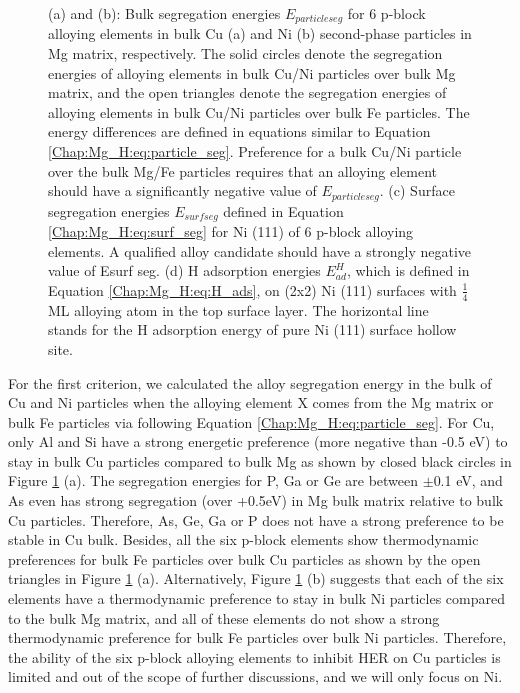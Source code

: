 \begin{figure}[!ht]
\caption[Effects of 6 p-block elements on other precipitates(Cu and Ni)]{(a) and (b): Bulk segregation energies $E_{particle seg}$ for 6 p-block alloying elements in bulk Cu (a) and Ni (b) second-phase particles in Mg matrix, respectively. The solid circles denote the segregation energies of alloying elements in bulk Cu/Ni particles over bulk Mg matrix, and the open triangles denote the segregation energies of alloying elements in bulk Cu/Ni particles over bulk Fe particles. The energy differences are defined in equations similar to Equation \ref{Chap:Mg_H:eq:particle_seg}. Preference for a bulk Cu/Ni particle over the bulk Mg/Fe particles requires that an alloying element should have a significantly negative value of $E_{particle seg}$. (c) Surface segregation energies $E_{surf seg}$ defined in Equation \ref{Chap:Mg_H:eq:surf_seg} for Ni (111) of 6 p-block alloying elements. A qualified alloy candidate should have a strongly negative value of Esurf seg. (d) H adsorption energies $E_{ad}^H$, which is defined in Equation \ref{Chap:Mg_H:eq:H_ads}, on (2x2) Ni (111) surfaces with $\frac{1}{4}$ \ac{ML} alloying atom in the top surface layer. The horizontal line stands for the H adsorption energy of pure Ni (111) surface hollow site.}
  \label{Chap:Mg_H:fig12}
\end{figure}
\endgroup

For the first criterion, we calculated the alloy segregation energy in the bulk of Cu and Ni particles when the alloying element X comes from the Mg matrix or bulk Fe particles via following Equation \ref{Chap:Mg_H:eq:particle_seg}. For Cu, only Al and Si have a strong energetic preference (more negative than -0.5 eV) to stay in bulk Cu particles compared to bulk Mg as shown by closed black circles in Figure \ref{Chap:Mg_H:fig12} (a). The segregation energies for P, Ga or Ge are between $\pm$0.1 eV, and As even has strong segregation (over +0.5eV) in Mg bulk matrix relative to bulk Cu particles.  Therefore, As, Ge, Ga or P does not have a strong preference to be stable in Cu bulk. Besides, all the six p-block elements show thermodynamic preferences for bulk Fe particles over bulk Cu particles as shown by the open triangles in Figure \ref{Chap:Mg_H:fig12} (a). Alternatively, Figure \ref{Chap:Mg_H:fig12} (b) suggests that each of the six elements have a thermodynamic preference to stay in bulk Ni particles compared to the bulk Mg matrix, and all of these elements do not show a strong thermodynamic preference for bulk Fe particles over bulk Ni particles. Therefore, the ability of the six p-block alloying elements to inhibit HER on Cu particles is limited and out of the scope of further discussions, and we will only focus on Ni.


